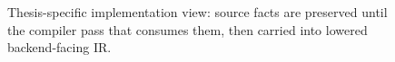 \begin{figure}[p]
\centering
\resizebox{\textwidth}{!}{}
\caption{Thesis-specific implementation view: source facts are preserved until
the compiler pass that consumes them, then carried into lowered backend-facing
IR.}
\label{fig:fragmentation}
\end{figure}
